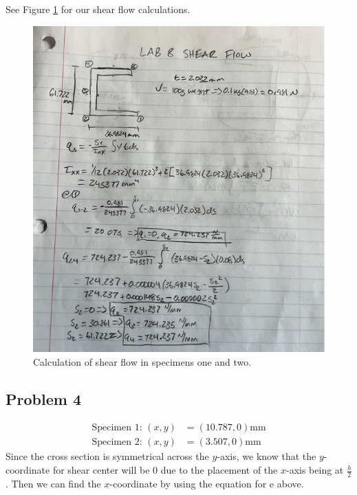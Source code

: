 \documentclass[12 pt]{report}
\begin{document}
See Figure \ref{fig:peter_work} for our shear flow calculations.

\begin{figure}[htbp]
	\centering
	\includegraphics[width=6in]{images/peter shear flow}
	\caption{Calculation of shear flow in specimens one and two.}
	\label{fig:peter_work}
\end{figure}

\subsection{Problem 4}\label{problem_4}

\begin{align*}
	\text{Specimen }\num{1}\text{: }(x,y)&=(\num{10.787},\num{0}) \unit{\mm}\\
	\text{Specimen }\num{2}\text{: }(x,y)&=(\num{3.507},\num{0}) \unit{\mm}
\end{align*}
Since the cross section is symmetrical across the $y$-axis, we know that the $y$-coordinate for shear center will be \num{0} due to the placement of the $x$-axis being at $\frac{h}{2}$. Then we can find the $x$-coordinate by using the equation for e above.  
\end{document}
